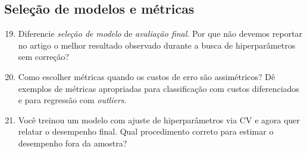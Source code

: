 \documentclass{article}
\begin{document}
\subsection{Seleção de modelos e métricas}
\begin{enumerate}
  \setcounter{enumi}{18}
  \item Diferencie \textit{seleção de modelo} de \textit{avaliação final}. Por que não devemos reportar no artigo o melhor resultado observado durante a busca de hiperparâmetros sem correção?
  \item Como escolher métricas quando os custos de erro são assimétricos? Dê exemplos de métricas apropriadas para classificação com custos diferenciados e para regressão com \textit{outliers}.
  \item Você treinou um modelo com ajuste de hiperparâmetros via CV e agora quer relatar o desempenho final. Qual procedimento correto para estimar o desempenho fora da amostra?
\end{enumerate}

%
%
\end{document}
